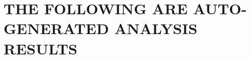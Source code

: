 \documentclass[11pt]{article}
\begin{document}
\clearpage
\section{THE FOLLOWING ARE AUTO-GENERATED ANALYSIS RESULTS}







%
%


%





\end{document}
